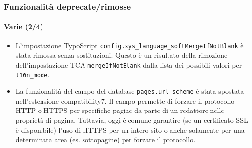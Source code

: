 \begin{frame}[fragile]
	\frametitle{Funzionalità deprecate/rimosse}
	\framesubtitle{Varie (2/4)}


	\begin{itemize}
		\item L'impostazione TypoScript \texttt{config.sys\_language\_softMergeIfNotBlank}
			è stata rimossa senza sostituzioni. Questo è un risultato della rimozione
			dell'impostazione TCA \texttt{mergeIfNotBlank} dalla lista dei possibili valori per \texttt{l10n\_mode}.

		\item La funzionalità del campo del database \texttt{pages.url\_scheme} è stata spostata
			nell'estensione compatibility7. Il campo permette di forzare il protocollo HTTP o HTTPS
			per specifiche pagine da parte di un redattore nelle proprietà di pagina. 
			Tuttavia, oggi è comune garantire (se un certificato SSL è disponibile)
			l'uso di HTTPS per un intero sito o anche solamente per una determinata area
			(es. sottopagine) per forzare il protocollo.

	\end{itemize}

\end{frame}


